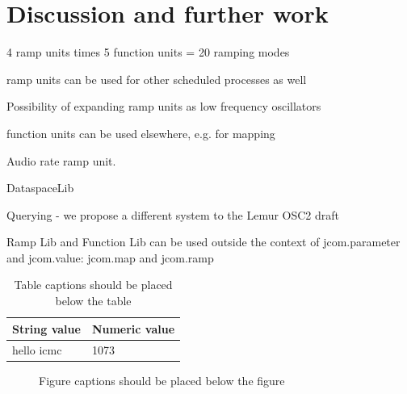 \documentclass{article}
\begin{document}
\section{Discussion and further work} %
\label{sec:discussion_and_further_work}

4 ramp units times 5 function units = 20 ramping modes

ramp units can be used for other scheduled processes as well

Possibility of expanding ramp units as low frequency oscillators

function units can be used elsewhere, e.g. for mapping

Audio rate ramp unit.

DataspaceLib

Querying - we propose a different system to the Lemur OSC2 draft

Ramp Lib and Function Lib can be used outside the context of jcom.parameter and jcom.value: jcom.map and jcom.ramp





\begin{table}
\begin{center}
\begin{tabular}{|l|l|}
\hline
String value & Numeric value \\
\hline
hello icmc  & 1073 \\
\hline
\end{tabular}
\end{center}
\caption{Table captions should be placed below the table}
\label{tab:example}
\end{table}

\begin{figure}
\centerline{}
\caption{Figure captions should be placed below the figure}
\label{fig:example}
\end{figure}
\end{document}
